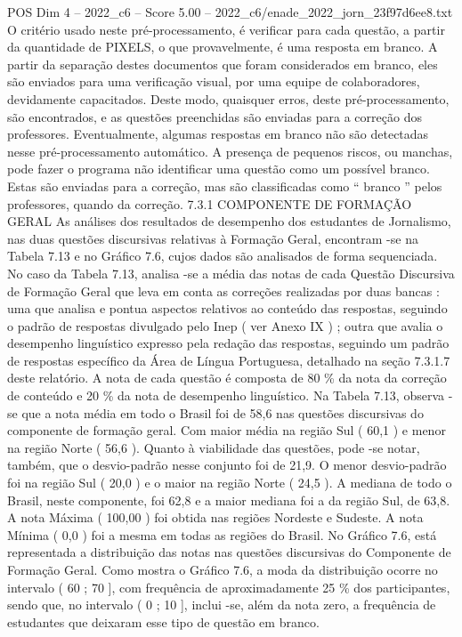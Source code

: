 \begin{textsample}{POS Dim 4 – 2022\_c6 – Score 5.00 – 2022\_c6/enade\_2022\_jorn\_23f97d6ee8.txt}
O critério usado neste pré-processamento, é verificar para cada questão, a partir da quantidade de PIXELS, o que provavelmente, é uma resposta em branco.
A partir da separação destes documentos que foram considerados em branco, eles são enviados para uma verificação visual, por uma equipe de colaboradores, devidamente capacitados.
Deste modo, quaisquer erros, deste pré-processamento, são encontrados, e as questões preenchidas são enviadas para a correção dos professores.
Eventualmente, algumas respostas em branco não são detectadas nesse pré-processamento automático.
A presença de pequenos riscos, ou manchas, pode fazer o programa não identificar uma questão como um possível branco.
Estas são enviadas para a correção, mas são classificadas como “ branco ” pelos professores, quando da correção. 7.3.1 COMPONENTE DE FORMAÇÃO GERAL As análises dos resultados de desempenho dos estudantes de Jornalismo, nas duas questões discursivas relativas à Formação Geral, encontram -se na Tabela 7.13 e no Gráfico 7.6, cujos dados são analisados de forma sequenciada.
No caso da Tabela 7.13, analisa -se a média das notas de cada Questão Discursiva de Formação Geral que leva em conta as correções realizadas por duas bancas : uma que analisa e pontua aspectos relativos ao conteúdo das respostas, seguindo o padrão de respostas divulgado pelo Inep ( ver Anexo IX ) ; outra que avalia o desempenho linguístico expresso pela redação das respostas, seguindo um padrão de respostas específico da Área de Língua Portuguesa, detalhado na seção 7.3.1.7 deste relatório.
A nota de cada questão é composta de 80 \% da nota da correção de conteúdo e 20 \% da nota de desempenho linguístico.
Na Tabela 7.13, observa -se que a nota média em todo o Brasil foi de 58,6 nas questões discursivas do componente de formação geral.
Com maior média na região Sul ( 60,1 ) e menor na região Norte ( 56,6 ).
Quanto à viabilidade das questões, pode -se notar, também, que o desvio-padrão nesse conjunto foi de 21,9.
O menor desvio-padrão foi na região Sul ( 20,0 ) e o maior na região Norte ( 24,5 ).
A mediana de todo o Brasil, neste componente, foi 62,8 e a maior mediana foi a da região Sul, de 63,8.
A nota Máxima ( 100,00 ) foi obtida nas regiões Nordeste e Sudeste.
A nota Mínima ( 0,0 ) foi a mesma em todas as regiões do Brasil.
No Gráfico 7.6, está representada a distribuição das notas nas questões discursivas do Componente de Formação Geral.
Como mostra o Gráfico 7.6, a moda da distribuição ocorre no intervalo ( 60 ; 70 ], com frequência de aproximadamente 25 \% dos participantes, sendo que, no intervalo ( 0 ; 10 ], inclui -se, além da nota zero, a frequência de estudantes que deixaram esse tipo de questão em branco.

\end{textsample}
